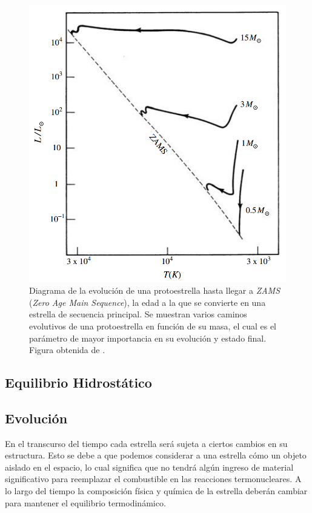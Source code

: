 \begin{figure}[!ht]
	\centering
	\includegraphics[scale=0.3]{Introduccion/Figures/EvolucionZAMSFormacionEstelar_Kutner.png}
	\caption{Diagrama de la evolución de una protoestrella hasta llegar a
	\textit{ZAMS} (\textit{Zero Age Main Sequence}), la edad a la que se
	convierte en una estrella de secuencia principal. Se muestran varios caminos
	evolutivos de una protoestrella en función de su masa, el cual es el
	parámetro de mayor importancia en su evolución y estado final. Figura
	obtenida de .}
	\label{protostarEvolutionFig}
\end{figure}

\subsection{Equilibrio Hidrostático}

\subsection{Evolución}

En el transcurso del tiempo cada estrella será sujeta a ciertos cambios en
su estructura. Esto se debe a que podemos considerar a una
estrella cómo un objeto aislado en el espacio, lo cual significa que no tendrá
algún ingreso de material significativo para reemplazar el combustible
 en las reacciones termonucleares. A lo largo del tiempo la
composición física y química de la estrella deberán cambiar para mantener el
equilibrio termodinámico.

